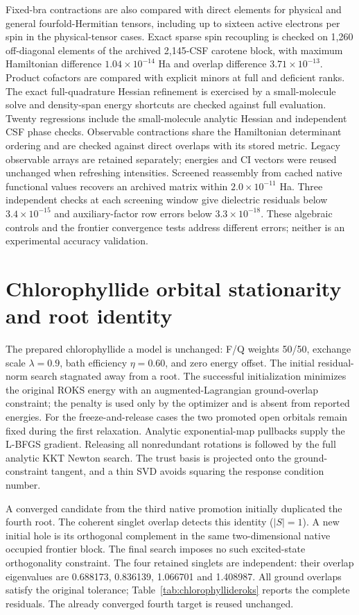 \documentclass[11pt,a4paper]{article}
\begin{document}
Fixed-bra contractions are also compared with direct elements for
physical and general fourfold-Hermitian tensors, including up to sixteen
active electrons per spin in the physical-tensor cases. Exact sparse spin recoupling is checked on 1,260 off-diagonal elements
of the archived 2,145-CSF carotene block, with maximum Hamiltonian
difference $1.04\times10^{-14}$ Ha and overlap difference
$3.71\times10^{-13}$. Product cofactors are compared with explicit minors
at full and deficient ranks. The exact full-quadrature Hessian refinement
is exercised by a small-molecule solve and density-span energy shortcuts
are checked against full evaluation. Twenty regressions include the
small-molecule analytic Hessian and independent CSF phase checks.
Observable contractions share the Hamiltonian determinant ordering and
are checked against direct overlaps with its stored metric. Legacy
observable arrays are retained separately; energies and CI vectors were
reused unchanged when refreshing intensities. Screened reassembly from
cached native functional values recovers an archived matrix within
$2.0\times10^{-11}$ Ha. Three independent checks at each screening
window give dielectric residuals below $3.4\times10^{-15}$ and
auxiliary-factor row errors below $3.3\times10^{-18}$. These algebraic
controls and the frontier convergence tests address different errors;
neither is an experimental accuracy validation.


\clearpage
\section{Chlorophyllide orbital stationarity and root identity}
The prepared chlorophyllide a model is unchanged: F/Q weights 50/50,
exchange scale $\lambda=0.9$, bath efficiency $\eta=0.60$, and zero
energy offset. The initial residual-norm search stagnated away from a
root. The successful initialization minimizes the original ROKS energy
with an augmented-Lagrangian ground-overlap constraint; the penalty
is used only by the optimizer and is absent from reported energies.
For the freeze-and-release cases the two promoted open orbitals remain
fixed during the first relaxation. Analytic exponential-map pullbacks
supply the L-BFGS gradient. Releasing all nonredundant rotations is
followed by the full analytic KKT Newton search. The trust basis is
projected onto the ground-constraint tangent, and a thin SVD avoids
squaring the response condition number.

A converged candidate from the third native promotion initially duplicated
the fourth root. The coherent singlet overlap detects this identity
($|S|=1$). A new initial hole is its orthogonal complement in the same
two-dimensional native occupied frontier block. The final search imposes
no such excited-state orthogonality constraint. The four retained singlets
are independent: their overlap eigenvalues are 0.688173, 0.836139,
1.066701 and 1.408987. All ground overlaps satisfy the original tolerance;
Table~\ref{tab:chlorophyllideroks} reports the complete residuals.
The already converged fourth target is reused unchanged.
\end{document}

